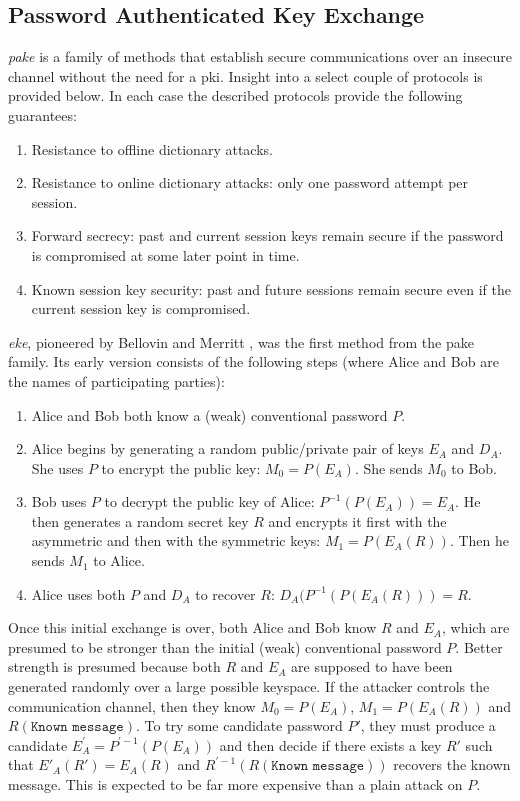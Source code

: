 \subsection{Password Authenticated Key Exchange}
\label{sec:pake}

\emph{\gls{pake}} is a family of methods that establish secure communications over an insecure channel without the need for a \gls{pki}. Insight into a select couple of protocols is provided below. In each case the described protocols provide the following guarantees:

\begin{enumerate}
    \item Resistance to offline dictionary attacks.
    \item Resistance to online dictionary attacks: only one password attempt per session.
    \item Forward secrecy: past and current session keys remain secure if the password is compromised at some later point in time.
    \item Known session key security: past and future sessions remain secure even if the current session key is compromised.
  \end{enumerate}

\emph{\gls{eke}}, pioneered by Bellovin and Merritt \cite{bellovin1992encrypted, bellovin1993augmented}, was the first method from the \gls{pake} family. Its early version consists of the following steps (where Alice and Bob are the names of participating parties):

\begin{enumerate}
    \item Alice and Bob both know a (weak) conventional password \(P\).
    \item Alice begins by generating a random public/private pair of keys \(E_A\) and \(D_A\). She uses \(P\) to encrypt the public key: \(M_0 = P(E_A)\). She sends \(M_0\) to Bob.
    \item Bob uses \(P\) to decrypt the public key of Alice: \(P^{-1}(P(E_A)) = E_A\). He then generates a random secret key \(R\) and encrypts it first with the asymmetric and then with the symmetric keys: \(M_1 = P(E_A(R))\). Then he sends \(M_1\) to Alice.
    \item Alice uses both \(P\) and \(D_A\) to recover \(R\): \(D_A(P^{-1}(P(E_A(R))) = R\).
  \end{enumerate}

Once this initial exchange is over, both Alice and Bob know \(R\) and \(E_A\), which are presumed to be stronger than the initial (weak) conventional password \(P\). Better strength is presumed because both \(R\) and \(E_A\) are supposed to have been generated randomly over a large possible keyspace. If the attacker controls the communication channel, then they know \(M_0 = P(E_A)\), \(M_1 = P(E_A(R))\) and \(R(\texttt{Known message})\). To try some candidate password \(P'\), they must produce a candidate \(E_A^{'} = P^{'-1}(P(E_A))\) and then decide if there exists a key \(R'\) such that \(E'_A(R') = E_A(R)\) and \(R^{'-1}(R(\texttt{Known message}))\) recovers the known message. This is expected to be far more expensive than a plain attack on \(P\).

